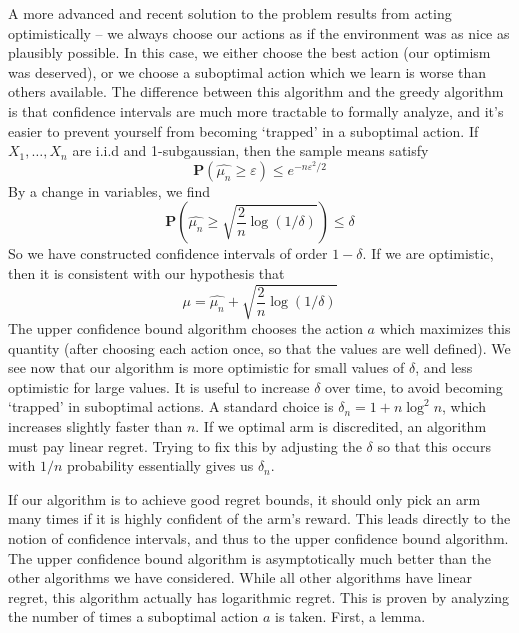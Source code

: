 A more advanced and recent solution to the problem results from acting optimistically -- we always choose our actions as if the environment was as nice as plausibly possible. In this case, we either choose the best action (our optimism was deserved), or we choose a suboptimal action which we learn is worse than others available. The difference between this algorithm and the greedy algorithm is that confidence intervals are much more tractable to formally analyze, and it's easier to prevent yourself from becoming `trapped' in a suboptimal action. If $X_1, \dots, X_n$ are i.i.d and 1-subgaussian, then the sample means satisfy
%
\[ \mathbf{P}(\widehat{\mu_n} \geq \varepsilon) \leq e^{-n\varepsilon^2/2} \]
%
By a change in variables, we find
%
\[ \mathbf{P}\left(\widehat{\mu_n} \geq \sqrt{\frac{2}{n} \log(1/\delta)} \right) \leq \delta \]
%
So we have constructed confidence intervals of order $1-\delta$. If we are optimistic, then it is consistent with our hypothesis that
%
\[ \mu = \widehat{\mu_n} + \sqrt{\frac{2}{n} \log(1/\delta)} \]
%
The upper confidence bound algorithm chooses the action $a$ which maximizes this quantity (after choosing each action once, so that the values are well defined). We see now that our algorithm is more optimistic for small values of $\delta$, and less optimistic for large values. It is useful to increase $\delta$ over time, to avoid becoming `trapped' in suboptimal actions. A standard choice is $\delta_n = 1 + n \log^2 n$, which increases slightly faster than $n$. If we optimal arm is discredited, an algorithm must pay linear regret. Trying to fix this by adjusting the $\delta$ so that this occurs with $1/n$ probability essentially gives us $\delta_n$.

If our algorithm is to achieve good regret bounds, it should only pick an arm many times if it is highly confident of the arm's reward. This leads directly to the notion of confidence intervals, and thus to the upper confidence bound algorithm. The upper confidence bound algorithm is asymptotically much better than the other algorithms we have considered. While all other algorithms have linear regret, this algorithm actually has logarithmic regret. This is proven by analyzing the number of times a suboptimal action $a$ is taken. First, a lemma.

